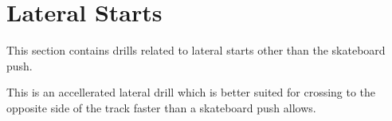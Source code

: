 \section{Lateral Starts}

This section contains drills related to lateral starts other than the skateboard push.  

This is an accellerated lateral drill which is better suited for crossing to the opposite side of the track faster than a skateboard push allows.
